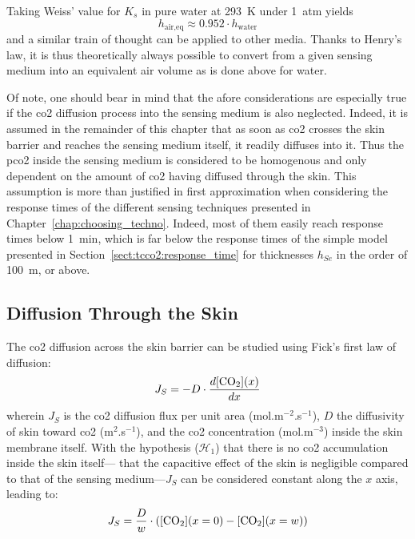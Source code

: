 Taking Weiss' value for $K_s$ in pure water at 293~K under 1~atm yields
\begin{equation}
	h_\text{air,eq} \approx 0.952 \cdot h_\text{water}
\end{equation}
and a similar train of thought can be applied to other media. Thanks to Henry's law, it is thus theoretically always possible to convert from a given sensing medium into an equivalent air volume as is done above for water.

Of note, one should bear in mind that the afore considerations are especially true if the \gls{co2} diffusion process into the sensing medium is also neglected. Indeed, it is assumed in the remainder of this chapter that as soon as \gls{co2} crosses the skin barrier and reaches the sensing medium itself, it readily diffuses into it. Thus the \gls{pco2} inside the sensing medium is considered to be homogenous and only dependent on the amount of \gls{co2} having diffused through the skin. This assumption is more than justified in first approximation when considering the response times of the different sensing techniques presented in Chapter~\ref{chap:choosing_techno}. Indeed, most of them easily reach response times below 1~min, which is far below the response times of the simple model presented in Section~\ref{sect:tcco2:response_time} for thicknesses $h_{Se}$ in the order of 100~\textmu{}m, or above.

\subsection{Diffusion Through the Skin}\label{sect:tcco2:diffusion_dynamic}

The \gls{co2} diffusion across the skin barrier can be studied using Fick's first law of diffusion:
\begin{equation}
	J_S = -D \cdot \frac{d \ce{[CO_2]}(x)}{dx}
\end{equation}
wherein $J_S$ is the \gls{co2} diffusion flux per unit area (mol.m$^{-2}$.s$^{-1}$), $D$ the diffusivity of skin toward \gls{co2} (m$^2$.s$^{-1}$), and \ce{[CO_2]} the \gls{co2} concentration (mol.m$^{-3}$) inside the skin membrane itself. With the hypothesis ($\mathcal{H}_1$) that there is no \gls{co2} accumulation inside the skin itself---\ie{} that the capacitive effect of the skin is negligible compared to that of the sensing medium---$J_S$ can be considered constant along the $x$ axis, leading to:
\begin{equation}\label{eq:tcco2:fick_int}
	J_S = \frac{D}{w} \cdot \left( \ce{[CO_2]}(x=0) - \ce{[CO_2]}(x=w)  \right)
\end{equation}

